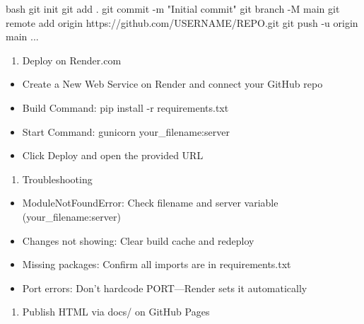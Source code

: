 \documentclass[
  letterpaper,
  DIV=11,
  numbers=noendperiod]{scrreprt}
\newenvironment{Shaded}{\begin{snugshade}}{\end{snugshade}}
\newcommand{\AttributeTok}[1]{\textcolor[rgb]{0.40,0.45,0.13}{#1}}
\newcommand{\ExtensionTok}[1]{\textcolor[rgb]{0.00,0.23,0.31}{#1}}
\newcommand{\FunctionTok}[1]{\textcolor[rgb]{0.28,0.35,0.67}{#1}}
\newcommand{\KeywordTok}[1]{\textcolor[rgb]{0.00,0.23,0.31}{\textbf{#1}}}
\newcommand{\NormalTok}[1]{\textcolor[rgb]{0.00,0.23,0.31}{#1}}
\newcommand{\StringTok}[1]{\textcolor[rgb]{0.13,0.47,0.30}{#1}}
\providecommand{\tightlist}{%
  \setlength{\itemsep}{0pt}\setlength{\parskip}{0pt}}\usepackage{longtable,booktabs,array}
\begin{document}
\begin{Shaded}
\begin{Highlighting}[]
\KeywordTok{\textasciigrave{}\textasciigrave{}\textasciigrave{}}\FunctionTok{bash} 
\FunctionTok{git}\NormalTok{ init}
\FunctionTok{git}\NormalTok{ add .}
\FunctionTok{git}\NormalTok{ commit }\AttributeTok{{-}m} \StringTok{"Initial commit"}
\FunctionTok{git}\NormalTok{ branch }\AttributeTok{{-}M}\NormalTok{ main}
\FunctionTok{git}\NormalTok{ remote add origin https://github.com/USERNAME/REPO.git}
\FunctionTok{git}\NormalTok{ push }\AttributeTok{{-}u}\NormalTok{ origin main}
\ExtensionTok{...}
\end{Highlighting}
\end{Shaded}

\begin{enumerate}
\def\labelenumi{\arabic{enumi})}
\setcounter{enumi}{4}
\tightlist
\item
  Deploy on Render.com
\end{enumerate}

\begin{itemize}
\tightlist
\item
  Create a New Web Service on Render and connect your GitHub repo
\item
  Build Command: pip install -r requirements.txt
\item
  Start Command: gunicorn your\_filename:server
\item
  Click Deploy and open the provided URL
\end{itemize}

\begin{enumerate}
\def\labelenumi{\arabic{enumi})}
\setcounter{enumi}{5}
\tightlist
\item
  Troubleshooting
\end{enumerate}

\begin{itemize}
\tightlist
\item
  ModuleNotFoundError: Check filename and server variable
  (your\_filename:server)
\item
  Changes not showing: Clear build cache and redeploy
\item
  Missing packages: Confirm all imports are in requirements.txt
\item
  Port errors: Don't hardcode PORT---Render sets it automatically
\end{itemize}

\begin{enumerate}
\def\labelenumi{\arabic{enumi})}
\setcounter{enumi}{6}
\tightlist
\item
  Publish HTML via docs/ on GitHub Pages
\end{enumerate}
\end{document}

